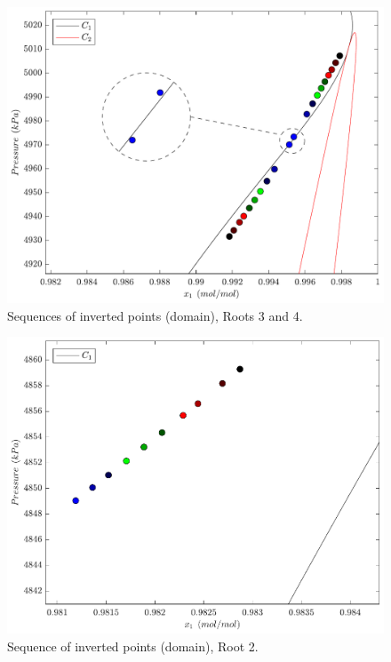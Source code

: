 \documentclass[journal=iecred,manuscript=article]{achemso}
\theoremstyle{definition}
\theoremstyle{remark}
\begin{document}
\begin{figure}
	\begin{center}
		\includegraphics[scale=0.50]{sequencia_pontos_dominio.pdf}
		\caption{Sequences of inverted points (domain), Roots 3 and 4.}\label{fig:points_domain_3_4}
	\end{center}
\end{figure}

\begin{figure}
	\begin{center}
		\includegraphics[scale=0.50]{sequencia_pontos_dominio_2.pdf}
		\caption{Sequence of inverted points (domain), Root 2.}\label{fig:points_domain_2}
	\end{center}
\end{figure}
\end{document}
